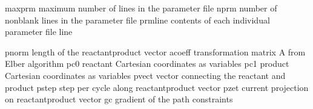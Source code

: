 \documentclass[letterpaper,11pt,english]{sphinxmanual}
\begin{document}

\begin{sphinxVerbatim}[commandchars=\\\{\}]
maxprm          maximum number of lines in the parameter file
nprm            number of nonblank lines in the parameter file
prmline         contents of each individual parameter file line
\end{sphinxVerbatim}


\begin{sphinxVerbatim}[commandchars=\\\{\}]
pnorm           length of the reactant\PYGZhy{}product vector
acoeff          transformation matrix \PYGZsq{}A\PYGZsq{} from Elber algorithm
pc0             reactant Cartesian coordinates as variables
pc1             product Cartesian coordinates as variables
pvect           vector connecting the reactant and product
pstep           step per cycle along reactant\PYGZhy{}product vector
pzet            current projection on reactant\PYGZhy{}product vector
gc              gradient of the path constraints
\end{sphinxVerbatim}

\end{document}

